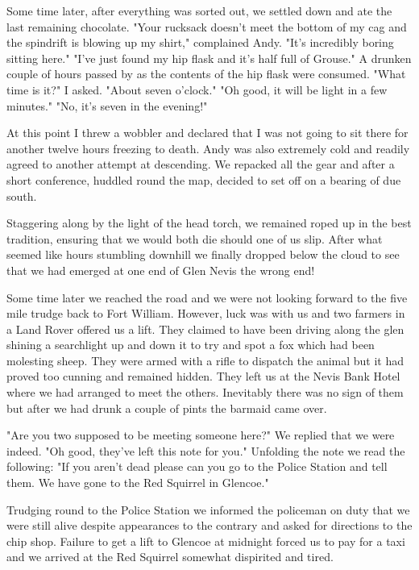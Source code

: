 \documentclass[a5paper,openany,font 10pt]{scrbook}
\begin{document}
Some time later, after everything was sorted out, we settled
down and ate the last remaining chocolate.  "Your rucksack doesn't
meet the bottom of my cag and the spindrift is blowing up my shirt,"
complained Andy.  "It's incredibly boring sitting here."  "I've just
found my hip flask and it's half full of Grouse."  A drunken couple of
hours passed by as the contents of the hip flask were consumed.  "What
time is it?" I asked.  "About seven o'clock."  "Oh good, it will be
light in a few minutes."  "No, it's seven in the evening!"

At this point I threw a wobbler and declared that I was not
going to sit there for another twelve hours freezing to death.  Andy
was also extremely cold and readily agreed to another attempt at
descending. We repacked all the gear and after a short conference,
huddled round the map, decided to set off on a bearing of due south.

Staggering along by the light of the head torch, we remained
roped up in the best tradition, ensuring that we would both die should
one of us slip. After what seemed like hours stumbling downhill we
finally dropped below the cloud to see that we had emerged at one end
of Glen Nevis the wrong end!

Some time later we reached the road and we were not looking
forward to the five mile trudge back to Fort William. However, luck
was with us and two farmers in a Land Rover offered us a lift. They
claimed to have been driving along the glen shining a searchlight up
and down it to try and spot a fox which had been molesting sheep. They
were armed with a rifle to dispatch the animal but it had proved too
cunning and remained hidden. They left us at the Nevis Bank Hotel
where we had arranged to meet the others. Inevitably there was no sign
of them but after we had drunk a couple of pints the barmaid came
over.

"Are you two supposed to be meeting someone here?"  We replied
that we were indeed.  "Oh good, they've left this note for
you."  Unfolding the note we read the following: "If you
aren't dead please can you go to the Police Station and tell
them. We have gone to the Red Squirrel in Glencoe."

Trudging round to the Police Station we informed the policeman
on duty that we were still alive despite appearances to the contrary
and asked for directions to the chip shop.  Failure to get a lift to
Glencoe at midnight forced us to pay for a taxi and we arrived at the
Red Squirrel somewhat dispirited and tired.
\end{document}
